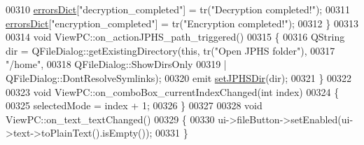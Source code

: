 \begin{DoxyCode}
00310     \hyperlink{class_view_p_c_aaf7f058e5589d65fec72a21abfd5629b}{errorsDict}[\textcolor{stringliteral}{"decryption\_completed"}] = tr(\textcolor{stringliteral}{"Decryption completed!"});
00311     \hyperlink{class_view_p_c_aaf7f058e5589d65fec72a21abfd5629b}{errorsDict}[\textcolor{stringliteral}{"encryption\_completed"}] = tr(\textcolor{stringliteral}{"Encryption completed!"});
00312 \}
00313 
00314 \textcolor{keywordtype}{void} ViewPC::on\_actionJPHS\_path\_triggered()
00315 \{
00316     QString dir = QFileDialog::getExistingDirectory(\textcolor{keyword}{this}, tr(\textcolor{stringliteral}{"Open JPHS folder"}),
00317                                                     \textcolor{stringliteral}{"/home"},
00318                                                     QFileDialog::ShowDirsOnly
00319                                                     | QFileDialog::DontResolveSymlinks);
00320     emit \hyperlink{class_view_p_c_ae81085836c0c01bc9556a5b27eb8d19c}{setJPHSDir}(dir);
00321 \}
00322 
00323 \textcolor{keywordtype}{void} ViewPC::on\_comboBox\_currentIndexChanged(\textcolor{keywordtype}{int} index)
00324 \{
00325     selectedMode = index + 1;
00326 \}
00327 
00328 \textcolor{keywordtype}{void} ViewPC::on\_text\_textChanged()
00329 \{
00330     ui->fileButton->setEnabled(ui->text->toPlainText().isEmpty());
00331 \}
\end{DoxyCode}
